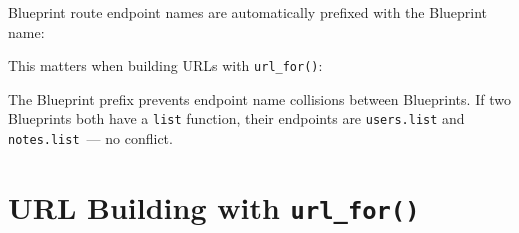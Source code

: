 Blueprint route endpoint names are automatically prefixed with the Blueprint name:

\begin{codebox}[short]

\begin{Shaded}
\begin{Highlighting}[]

\end{Highlighting}
\end{Shaded}

\end{codebox}

\noindent{}This matters when building URLs with \texttt{url\_for()}:

\begin{codebox}[short]

\begin{Shaded}
\begin{Highlighting}[]

\NormalTok{)           }
\OperatorTok{=}\NormalTok{) }

\NormalTok{)  }
\end{Highlighting}
\end{Shaded}

\end{codebox}

\noindent{}The Blueprint prefix prevents endpoint name collisions between Blueprints. If two Blueprints both have a \texttt{list} function, their endpoints are \texttt{users.list} and \texttt{notes.list}~--- no conflict.

\setcounter{section}{6}
\section{\texorpdfstring{URL Building with \texttt{url\_for()}}{URL Building with url\_for()}}\label{32-routing:327-url-building-with-url-for}

